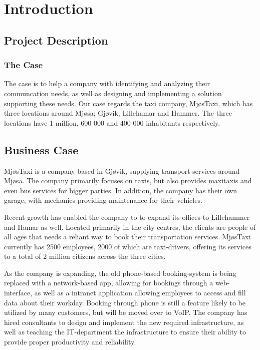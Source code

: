 \chapter{Introduction}
\label{chap:introduction}

\section{Project Description}

\subsection{The Case}
The case is to help a company with identifying and analyzing their communcation needs, as well as designing and implementing a solution supporting these needs. 
Our case regards the taxi company, MjøsTaxi, which has three locations around Mjøsa; Gjøvik, Lillehamar and Hammer.
The three locations have 1 million, 600 000 and 400 000 inhabitants respectively.


\section{Business Case}
MjøsTaxi is a company based in Gjøvik, supplying transport services around Mjøsa. 
The company primarily focuses on taxis, but also provides maxitaxis and even bus services for bigger parties.
In addition, the company has their own garage, with mechanics providing maintenance for their vehicles.

Recent growth has enabled the company to to expand its offices to Lillehammer and Hamar as well. 
Located primarily in the city centres, the clients are people of all ages that needs a reliant way to book their transportation services.
MjøsTaxi currently has 2500 employees, 2000 of which are taxi-drivers, offering its services to a total of 2 million citizens across the three cities.

As the company is expanding, the old phone-based booking-system is being replaced with a network-based app, allowing for bookings through a web-interface, as well as a intranet application allowing employees to access and fill data about their workday. %
Booking through phone is still a feature likely to be utilized by many customers, but will be moved over to VoIP.
The company has hired consultants to design and implement the new required infrastructure, as well as teaching the IT-department the infrastructure to ensure their ability to provide proper productivity and reliability.

